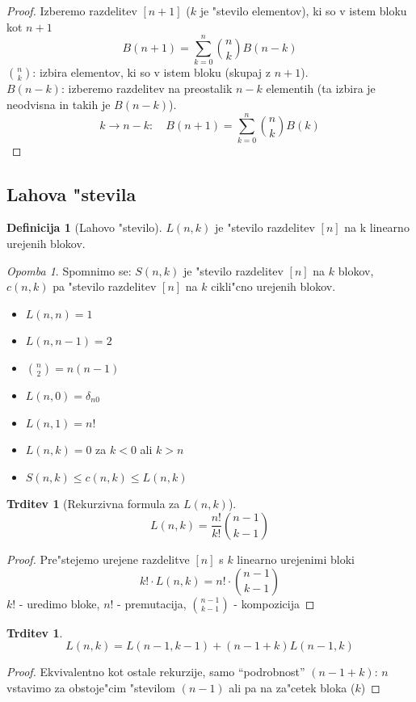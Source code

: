 \documentclass[a4paper,12pt]{article}
\theoremstyle{definition}
\newtheorem{defn}[counter]{Definicija}
\newtheorem{claim}[counter]{Trditev}
\theoremstyle{remark}
\newtheorem*{rem}{Opomba}
\begin{document}
\begin{proof}
    Izberemo razdelitev $[n+1]$ ($k$ je "stevilo elementov), ki so v istem bloku kot $n+1$
    \[B(n+1) = \sum_{k=0}^n \binom{n}{k}B(n-k)\]
    $\binom{n}{k}$: izbira elementov, ki so v istem bloku (skupaj z $n+1$). \\
    $B(n-k)$: izberemo razdelitev na preostalik $n-k$ elementih (ta izbira je neodvisna in takih je $B(n-k)$).
    \[k \rightarrow n-k: \quad B(n+1) = \sum_{k=0}^n \binom{n}{k}B(k)\]
\end{proof}

\subsection{Lahova "stevila}
\begin{defn}[Lahovo "stevilo]
	$L(n,k)$ je "stevilo razdelitev $[n]$ na k linearno urejenih blokov.
\end{defn}
\begin{rem}
	Spomnimo se: $S(n,k)$ je "stevilo razdelitev $[n]$ na $k$ blokov, $c(n,k)$ pa "stevilo razdelitev $[n]$ na $k$ cikli"cno urejenih blokov.
\end{rem}


\begin{itemize}
	\item $L(n,n) = 1$
	\item $L(n,n-1) = 2$
	\item $\binom{n}{2} = n(n-1)$
	\item $L(n,0) = \delta_{n0}$
	\item $L(n,1) = n!$
	\item $L(n,k) = 0$ za $k < 0$ ali $k > n$
	\item $S(n,k) \leq c(n,k) \leq L(n,k)$
\end{itemize}

\begin{claim}[Rekurzivna formula za $L(n, k)$]
    \[L(n,k) = \frac{n!}{k!} \binom{n-1}{k-1}\]
\end{claim}
\begin{proof}
    Pre"stejemo urejene razdelitve $[n]$ s $k$ linearno urejenimi bloki
    \[ k! \cdot L(n,k) = n! \cdot \binom{n-1}{k-1} \]
    $k!$ - uredimo bloke, $n!$ - premutacija, $\binom{n-1}{k-1}$ - kompozicija
\end{proof}

\begin{claim}
    \[L(n,k) = L(n-1, k-1) + (n-1+k) L(n-1, k)\]
\end{claim}
\begin{proof}
    Ekvivalentno kot ostale rekurzije, samo ``podrobnost'' $(n-1+k)$: $n$ vstavimo za obstoje"cim "stevilom $(n-1)$ ali pa na za"cetek bloka ($k$)
\end{proof}
\end{document}
